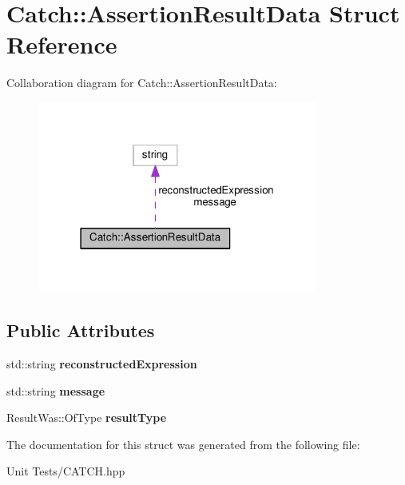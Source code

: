 \hypertarget{structCatch_1_1AssertionResultData}{}\section{Catch\+:\+:Assertion\+Result\+Data Struct Reference}
\label{structCatch_1_1AssertionResultData}


Collaboration diagram for Catch\+:\+:Assertion\+Result\+Data\+:
\nopagebreak
\begin{figure}[H]
\begin{center}
\leavevmode
\includegraphics[width=262pt]{structCatch_1_1AssertionResultData__coll__graph}
\end{center}
\end{figure}
\subsection*{Public Attributes}
\begin{DoxyCompactItemize}
\item 
std\+::string {\bfseries reconstructed\+Expression}\hypertarget{structCatch_1_1AssertionResultData_a9e809d36fffbeb1c7d0cbe7382dd9595}{}\label{structCatch_1_1AssertionResultData_a9e809d36fffbeb1c7d0cbe7382dd9595}

\item 
std\+::string {\bfseries message}\hypertarget{structCatch_1_1AssertionResultData_ac34215803c4c4a88f795879f61c1f7b4}{}\label{structCatch_1_1AssertionResultData_ac34215803c4c4a88f795879f61c1f7b4}

\item 
Result\+Was\+::\+Of\+Type {\bfseries result\+Type}\hypertarget{structCatch_1_1AssertionResultData_a7ceab4a7ff722aec5587e3748caf66b7}{}\label{structCatch_1_1AssertionResultData_a7ceab4a7ff722aec5587e3748caf66b7}

\end{DoxyCompactItemize}


The documentation for this struct was generated from the following file\+:\begin{DoxyCompactItemize}
\item 
Unit Tests/C\+A\+T\+C\+H.\+hpp\end{DoxyCompactItemize}
